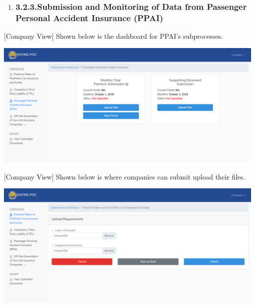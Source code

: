 \documentclass{article}
\begin{document}
\begin{enumerate}[noitemsep,topsep=\mdcompacttopsep]%

\item{}
\subsubsection{3.2.3.\hspace*{0.5em}Submission and Monitoring of Data from Passenger Personal Accident Insurance (PPAI)}\label{sec-submission-and-monitoring-of-data-from-passenger-personal-accident-insurance-ppai}%
\end{enumerate}%

\noindent{}[Company View] Shown below is the dashboard for
PPAI’s subprocesses.%

\includegraphics[keepaspectratio=true]{up-ic-screens/image94}{}%

[Company View] Shown below is where companies can
submit upload their files.%

\includegraphics[keepaspectratio=true]{up-ic-screens/image164}{}%
\end{document}

